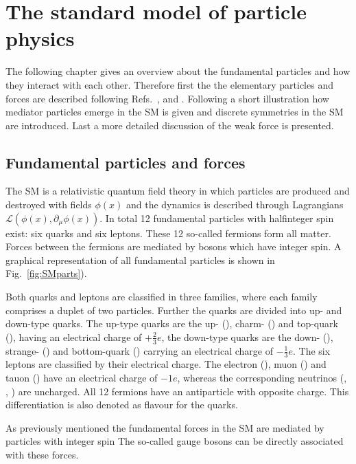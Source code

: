 \chapter{The standard model of particle physics}
\label{chap:SM}

The following chapter gives an overview about the fundamental particles and how they interact with each other. Therefore first
the the elementary particles and forces are described following Refs.~\cite{Griffiths:111880}, \cite{Perkins:396126} and
\cite{Peskin:257493}. Following a short illustration how mediator particles emerge in the \ac{SM} is given and discrete symmetries
in the \ac{SM} are introduced. Last a more detailed discussion of the weak force is presented.

\section{Fundamental particles and forces}
\label{sec:fundamentalparts}

The \ac{SM} is a relativistic quantum field theory in which particles are produced and destroyed with fields $\phi(x)$ and the
dynamics is described through Lagrangians $\mathcal{L}\left(\phi(x),\partial_{\mu}\phi(x)\right)$. In total \num{12} fundamental
particles with halfinteger spin exist: six quarks and six leptons. These \num{12} so-called fermions form all matter. Forces
between the fermions are mediated by bosons which have integer spin. A graphical representation of all fundamental particles is
shown in Fig.~\cref{fig:SMparts}).

Both quarks and leptons are classified in three families, where each family comprises a duplet of two particles. Further the quarks
are divided into up- and down-type quarks. The up-type quarks are the up- (\uquark), charm- (\cquark) and top-quark (\tquark), having
an electrical charge of $+\frac{2}{3}e$, the down-type quarks are the down- (\dquark), strange- (\squark) and bottom-quark (\bquark)
carrying an electrical charge of $-\frac{1}{3}e$. The six leptons are classified by their electrical charge. The electron  (\electron),
muon (\muon) and tauon (\tauon) have an electrical charge of $-1e$, whereas the corresponding neutrinos (\neue, \neum, \neut) are
uncharged. All \num{12} fermions have an antiparticle with opposite charge. This differentiation is also denoted as flavour for the
quarks.

As previously mentioned the fundamental forces in the \ac{SM} are mediated by particles with integer spin The so-called gauge bosons
can be directly associated with these forces.

